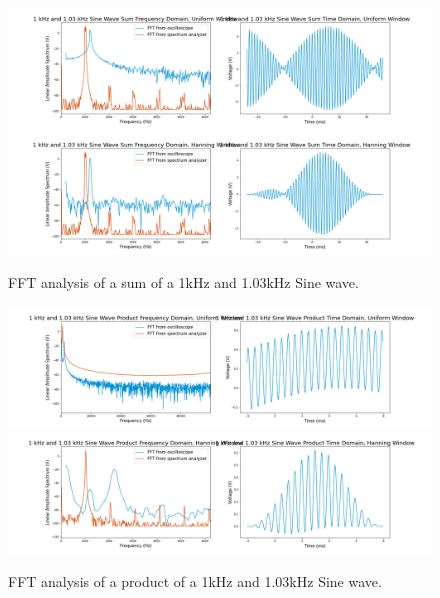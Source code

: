 \documentclass[12pt]{article}
\begin{document}
\begin{figure}[!ht]
    \centering
    \includegraphics[width=\textwidth]{1 kHz and 1_03 kHz Sine Wave Sum (uniform)}
    \includegraphics[width=\textwidth]{1 kHz and 1_03 kHz Sine Wave Sum (hanning)}
    \caption{FFT analysis of a sum of a 1kHz and 1.03kHz Sine wave.}
    \label{fig:sine_sum}
\end{figure} %
    
\begin{figure}[!ht]
    \centering
    \includegraphics[width=\textwidth]{1 kHz and 1_03 kHz Sine Wave Product (uniform)}
    \includegraphics[width=\textwidth]{1 kHz and 1_03 kHz Sine Wave Product (hanning)}
    \caption{FFT analysis of a product of a 1kHz and 1.03kHz Sine wave.}
    \label{fig:sine_product}
\end{figure} %
    
\end{document}
